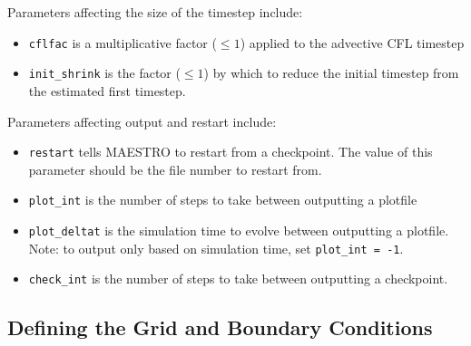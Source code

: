\noindent Parameters affecting the size of the timestep include:
\begin{itemize}
\item {\tt cflfac} is a multiplicative factor ({\tt $\le 1$}) 
      applied to the advective CFL timestep

\item {\tt init\_shrink} is the factor ({\tt $\le 1$}) by which to reduce 
      the initial timestep from the estimated first timestep.
\end{itemize}

\noindent Parameters affecting output and restart include:
\begin{itemize}

\item {\tt restart} tells MAESTRO to restart from a checkpoint.  The
      value of this parameter should be the file number to restart from.

\item {\tt plot\_int} is the number of steps to take between
  outputting a plotfile

\item {\tt plot\_deltat} is the simulation time to evolve between
  outputting a plotfile.  Note: to output only based on simulation
  time, set {\tt plot\_int = -1}.

\item {\tt check\_int} is the number of steps to take between
  outputting a checkpoint.

\end{itemize}

\subsection{Defining the Grid and Boundary Conditions}

